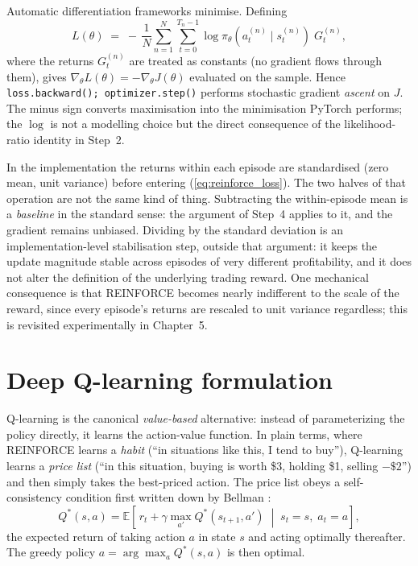 Automatic differentiation frameworks minimise. Defining
\begin{equation}
L(\theta) \;=\; -\,\frac{1}{N}\sum_{n=1}^{N}\sum_{t=0}^{T_n-1}
 \log \pi_\theta(a^{(n)}_t \mid s^{(n)}_t)\; G^{(n)}_t ,
\label{eq:reinforce_loss}
\end{equation}
where the returns $G^{(n)}_t$ are treated as constants (no gradient flows
through them), gives
$\nabla_\theta L(\theta) = -\nabla_\theta J(\theta)$ evaluated on the
sample. Hence \texttt{loss.backward(); optimizer.step()} performs
stochastic gradient \emph{ascent} on $J$. The minus sign converts
maximisation into the minimisation PyTorch performs; the $\log$ is not a
modelling choice but the direct consequence of the likelihood-ratio
identity in Step~2.

In the implementation the returns within each episode are standardised
(zero mean, unit variance) before entering (\ref{eq:reinforce_loss}). The
two halves of that operation are not the same kind of thing. Subtracting
the within-episode mean is a \emph{baseline} in the standard sense: the
argument of Step~4 applies to it, and the gradient remains unbiased.
Dividing by the standard deviation is an implementation-level
stabilisation step, outside that argument: it keeps the update magnitude
stable across episodes of very different profitability, and it does not
alter the definition of the underlying trading reward. One mechanical
consequence is that REINFORCE becomes nearly indifferent to the scale of
the reward, since every episode's returns are rescaled to unit variance
regardless; this is revisited experimentally in Chapter~5.

\section{Deep Q-learning formulation}
\label{sec:dqn}

Q-learning is the canonical \emph{value-based} alternative: instead of
parameterizing the policy directly, it learns the action-value function.
In plain terms, where REINFORCE learns a \emph{habit} (``in situations
like this, I tend to buy''), Q-learning learns a \emph{price list}
(``in this situation, buying is worth \$3, holding \$1, selling
$-\$2$'') and then simply takes the best-priced action. The price list
obeys a self-consistency condition first written down by Bellman
\cite{bellman1957}:
\begin{equation}
Q^\ast(s,a) = \mathbb{E}\!\left[\, r_t + \gamma \max_{a'} Q^\ast(s_{t+1},a')
 \;\middle|\; s_t = s,\; a_t = a \right],
\label{eq:bellman}
\end{equation}
the expected return of taking action $a$ in state $s$ and acting optimally
thereafter. The greedy policy $a = \arg\max_a Q^\ast(s,a)$ is then optimal.

